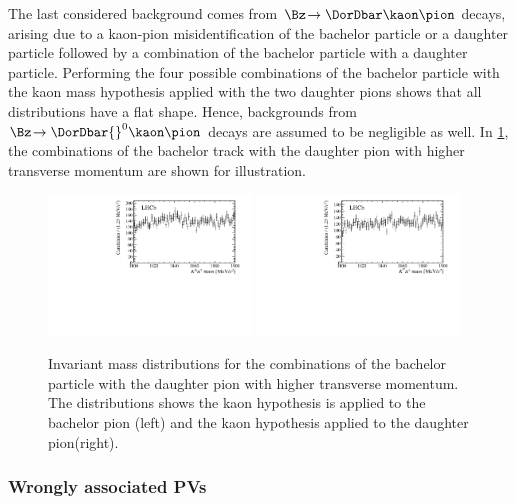 The last considered background comes from $\Bz\!\to\DorDbar\kaon\pion$ decays, arising due to a kaon-pion misidentification of the bachelor particle or a \Dm daughter particle followed by a combination of the bachelor particle with a \Dm daughter particle.
Performing the four possible combinations of the bachelor particle with the kaon mass hypothesis applied with the two \Dm daughter pions shows that all distributions have a flat shape.
Hence, backgrounds from $\Bz\!\to\DorDbar{}^0\kaon\pion$ decays are assumed to be negligible as well.
In \cref{fig:DzVeto}, the combinations of the bachelor track with the \Dm daughter pion with higher transverse momentum are shown for illustration.
\begin{figure}[tbp]
    \centering
    \includegraphics[width=0.48\textwidth]{07selection/figs/D0Hypo3.pdf}
    \includegraphics[width=0.48\textwidth]{07selection/figs/D0Hypo4.pdf}
    \caption{Invariant mass distributions for the combinations of the bachelor particle with the \Dm daughter pion with higher transverse momentum.
    The distributions shows the kaon hypothesis is applied to the bachelor pion (left) and the kaon hypothesis applied to the \Dm daughter pion(right).}
    \label{fig:DzVeto}
\end{figure}

\subsubsection*{Wrongly associated PVs}

